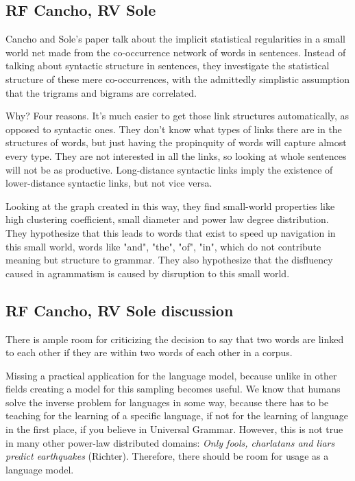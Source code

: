 \documentclass[12pt]{article}
\begin{document}
\subsection{RF Cancho, RV Sole}
Cancho and Sole's paper talk about the implicit statistical regularities in a small world net made from the co-occurrence network of words in sentences. Instead of talking about syntactic structure in sentences, they investigate the statistical structure of these mere co-occurrences, with the admittedly simplistic assumption that the trigrams and bigrams are correlated.

Why? Four reasons. It's much easier to get those link structures automatically, as opposed to syntactic ones. They don't know what types of links there are in the structures of words, but just having the propinquity of words will capture almost every type. They are not interested in all the links, so looking at whole sentences will not be as productive. Long-distance syntactic links imply the existence of lower-distance syntactic links, but not vice versa. %

Looking at the graph created in this way, they find small-world properties like high clustering coefficient, small diameter and power law degree distribution. They hypothesize that this leads to words that exist to speed up navigation in this small world, words like "and", "the", "of", "in", which do not contribute meaning but structure to grammar. They also hypothesize that the disfluency caused in agrammatism is caused by disruption to this small world.

\subsection{RF Cancho, RV Sole discussion}

There is ample room for criticizing the decision to say that two words are linked to each other if they are within two words of each other in a corpus. %

Missing a practical application for the language model, because unlike in other fields creating a model for this sampling becomes useful. We know that humans solve the inverse problem for languages in some way, because there has to be teaching for the learning of a specific language, if not for the learning of language in the first place, if you believe in Universal Grammar. However, this is not true in many other power-law distributed domains: \emph{Only fools, charlatans and liars predict earthquakes} (Richter). Therefore, there should be room for usage as a language model. %
\end{document}
